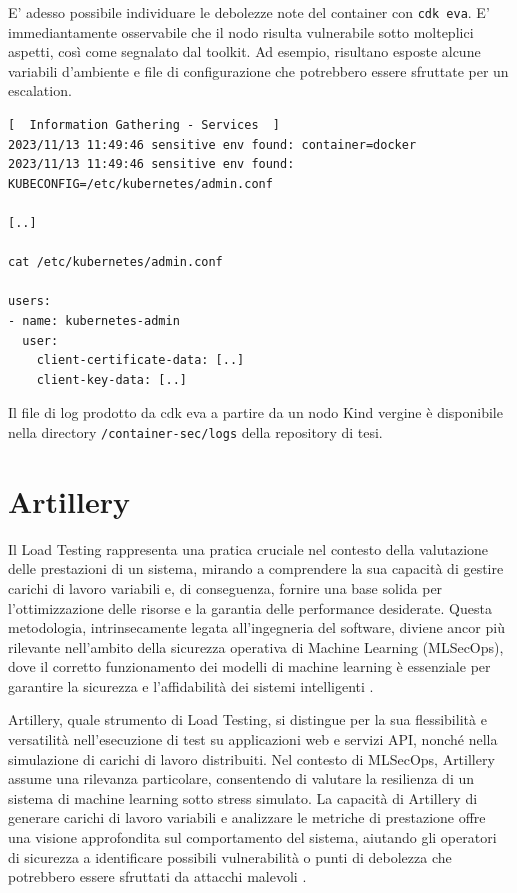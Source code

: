E' adesso possibile individuare le debolezze note del container con {\small \verb|cdk eva|}. E' immediantamente osservabile che il nodo risulta vulnerabile sotto molteplici aspetti, così come segnalato dal toolkit. Ad esempio, risultano esposte alcune variabili d'ambiente e file di configurazione che potrebbero essere sfruttate per un escalation.

\begin{code}
\label{code:apx:a:yaml}
\begin{verbatim}
[  Information Gathering - Services  ]
2023/11/13 11:49:46 sensitive env found: container=docker
2023/11/13 11:49:46 sensitive env found: KUBECONFIG=/etc/kubernetes/admin.conf

[..]

cat /etc/kubernetes/admin.conf

users:
- name: kubernetes-admin
  user:
    client-certificate-data: [..]
    client-key-data: [..]
\end{verbatim}
\end{code}

Il file di log prodotto da cdk eva a partire da un nodo Kind vergine è disponibile nella directory {\small \verb|/container-sec/logs|} della repository di tesi.

\section{Artillery}

Il Load Testing rappresenta una pratica cruciale nel contesto della valutazione delle prestazioni di un sistema, mirando a comprendere la sua capacità di gestire carichi di lavoro variabili e, di conseguenza, fornire una base solida per l'ottimizzazione delle risorse e la garantia delle performance desiderate. Questa metodologia, intrinsecamente legata all'ingegneria del software, diviene ancor più rilevante nell'ambito della sicurezza operativa di Machine Learning (MLSecOps), dove il corretto funzionamento dei modelli di machine learning è essenziale per garantire la sicurezza e l'affidabilità dei sistemi intelligenti \cite{load_testing_overview}.

Artillery, quale strumento di Load Testing, si distingue per la sua flessibilità e versatilità nell'esecuzione di test su applicazioni web e servizi API, nonché nella simulazione di carichi di lavoro distribuiti. Nel contesto di MLSecOps, Artillery assume una rilevanza particolare, consentendo di valutare la resilienza di un sistema di machine learning sotto stress simulato. La capacità di Artillery di generare carichi di lavoro variabili e analizzare le metriche di prestazione offre una visione approfondita sul comportamento del sistema, aiutando gli operatori di sicurezza a identificare possibili vulnerabilità o punti di debolezza che potrebbero essere sfruttati da attacchi malevoli \cite{artillery_overview}.

